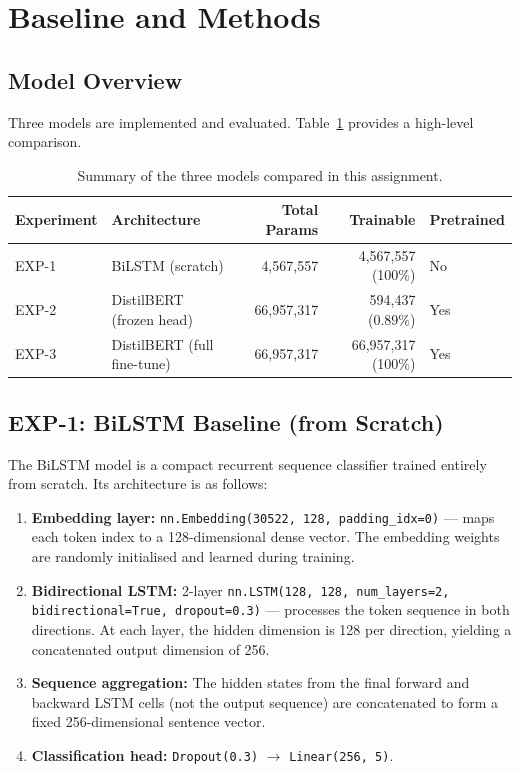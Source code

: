 \section{Baseline and Methods}

\subsection{Model Overview}

Three models are implemented and evaluated. Table~\ref{tab:model_summary} provides a high-level comparison.

\begin{table}[H]
    \centering
    \caption{Summary of the three models compared in this assignment.}
    \label{tab:model_summary}
    \begin{tabularx}{\textwidth}{l l r r l}
        \toprule
        \textbf{Experiment} & \textbf{Architecture} & \textbf{Total Params} & \textbf{Trainable} & \textbf{Pretrained} \\
        \midrule
        EXP-1 & BiLSTM (scratch)          & 4,567,557  & 4,567,557 (100\%)   & No \\
        EXP-2 & DistilBERT (frozen head)  & 66,957,317 & 594,437 (0.89\%)    & Yes \\
        EXP-3 & DistilBERT (full fine-tune)& 66,957,317 & 66,957,317 (100\%) & Yes \\
        \bottomrule
    \end{tabularx}
\end{table}

\subsection{EXP-1: BiLSTM Baseline (from Scratch)}

The BiLSTM model is a compact recurrent sequence classifier trained entirely from scratch. Its architecture is as follows:

\begin{enumerate}
    \item \textbf{Embedding layer:} \texttt{nn.Embedding(30522, 128, padding\_idx=0)} — maps each token index to a 128-dimensional dense vector. The embedding weights are randomly initialised and learned during training.
    \item \textbf{Bidirectional LSTM:} 2-layer \texttt{nn.LSTM(128, 128, num\_layers=2, bidirectional=True, dropout=0.3)} — processes the token sequence in both directions. At each layer, the hidden dimension is 128 per direction, yielding a concatenated output dimension of 256.
    \item \textbf{Sequence aggregation:} The hidden states from the final forward and backward LSTM cells (not the output sequence) are concatenated to form a fixed 256-dimensional sentence vector.
    \item \textbf{Classification head:} \texttt{Dropout(0.3)} $\to$ \texttt{Linear(256, 5)}.
\end{enumerate}

